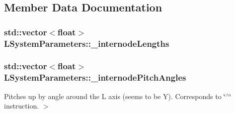 \subsection{Member Data Documentation}
\hypertarget{classLSystemParameters_a2465e8385f6f4a44e6066b8e373f911a}{
\subsubsection[{\-\_\-internode\-Lengths}]{\setlength{\rightskip}{0pt plus 5cm}std\-::vector$<$float$>$ L\-System\-Parameters\-::\-\_\-internode\-Lengths\hspace{0.3cm}{\ttfamily [private]}}}\label{classLSystemParameters_a2465e8385f6f4a44e6066b8e373f911a}
\hypertarget{classLSystemParameters_a262a0b893a9ef18489b35cce0b6053b6}{
\subsubsection[{\-\_\-internode\-Pitch\-Angles}]{\setlength{\rightskip}{0pt plus 5cm}std\-::vector$<$float$>$ L\-System\-Parameters\-::\-\_\-internode\-Pitch\-Angles\hspace{0.3cm}{\ttfamily [private]}}}\label{classLSystemParameters_a262a0b893a9ef18489b35cce0b6053b6}


Pitches up by angle around the L axis (seems to be Y). Corresponds to \char`\"{}$^\wedge$\char`\"{} instruction. $>$ 

